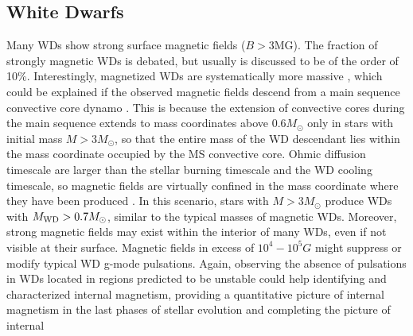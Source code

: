 {\color{red} \subsection{White Dwarfs}}
Many WDs show strong surface magnetic fields ($B>$3MG). The fraction of strongly magnetic WDs is debated, but usually is discussed to be of the order of 10\%. Interestingly, magnetized WDs are systematically more massive \cite{Ferrario_2015}, which could be explained if the observed magnetic fields descend from a main sequence convective core dynamo \cite{Cantiello_2016}. This is because the extension of convective cores during the main sequence extends to mass coordinates above 0.6$M_\odot$ only in stars with initial mass $M>3M_\odot$, so that the entire mass of the WD descendant lies within the mass coordinate occupied by the MS convective core. Ohmic diffusion timescale are larger than the stellar burning timescale and the WD cooling timescale, so magnetic fields are virtually confined in the mass coordinate where they have been produced \cite{Cantiello_2016}. In this scenario, stars with $M>3M_\odot$ produce WDs with $M_{\rm WD}>0.7M_\odot$, similar to the typical masses of magnetic WDs. Moreover, strong magnetic fields may exist within the interior of many WDs, even if not visible at their surface. Magnetic fields in excess of $10^4-10^5 G$ might suppress or modify typical WD g-mode pulsations. Again, observing the absence of pulsations in WDs located in regions predicted to be unstable could help identifying and characterized internal magnetism, providing a quantitative picture of internal magnetism in the last phases of stellar evolution and completing the picture of internal 

